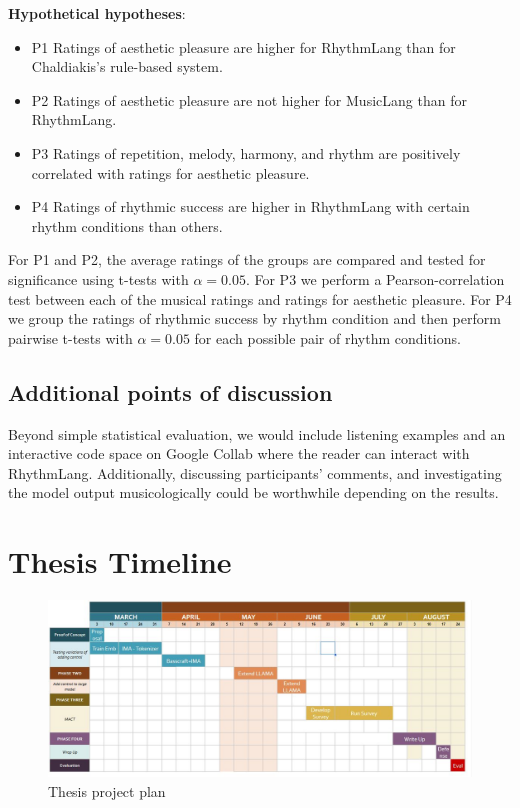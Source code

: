 \textbf{Hypothetical hypotheses}: 
\begin{itemize}
\item{P1} Ratings of aesthetic pleasure are higher for RhythmLang than for Chaldiakis's rule-based system. \\
\item{P2} Ratings of aesthetic pleasure are not higher for MusicLang than for RhythmLang. \\
\item{P3} Ratings of repetition, melody, harmony, and rhythm are positively correlated with ratings for aesthetic pleasure.\\
\item{P4} Ratings of rhythmic success are higher in RhythmLang with certain rhythm conditions than others. \\
\end{itemize}

For P1 and P2, the average ratings of the groups are compared and tested for significance using t-tests with $\alpha=0.05$. 
For P3 we perform a Pearson-correlation test between each of the musical ratings and ratings for aesthetic pleasure.
For P4 we group the ratings of rhythmic success by rhythm condition and then perform pairwise t-tests with $\alpha=0.05$ for each possible pair of rhythm conditions. 


\subsection{Additional points of discussion}
Beyond simple statistical evaluation, we would include listening examples and an interactive code space on Google Collab where the reader can interact with RhythmLang. Additionally, discussing participants' comments, and investigating the model output musicologically could be worthwhile depending on the results. 
\section{Thesis Timeline}

\begin{figure}[H]
    \centering
    \includegraphics[width=1\textwidth]{IMAGES/project_plan.jpg} 
    \caption{Thesis project plan}
    \label{fig:projectplan}
\end{figure}


